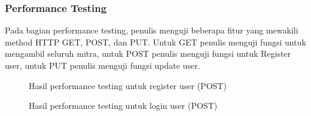 \subsubsection{Performance Testing}
Pada bagian performance testing, penulis menguji beberapa fitur yang mewakili method HTTP GET, POST, dan PUT. Untuk GET penulis menguji fungsi untuk mengambil seluruh mitra, untuk POST penulis menguji fungsi untuk Register user, untuk PUT penulis menguji fungsi update user.

\begin{figure}[H]
	{\par}
	\caption{Hasil performance testing untuk register user (POST)}
	\label{register-testing}
\end{figure}

\begin{figure}[H]
	{\par}
	\caption{Hasil performance testing untuk login user (POST)}
	\label{login-testing}
\end{figure}

